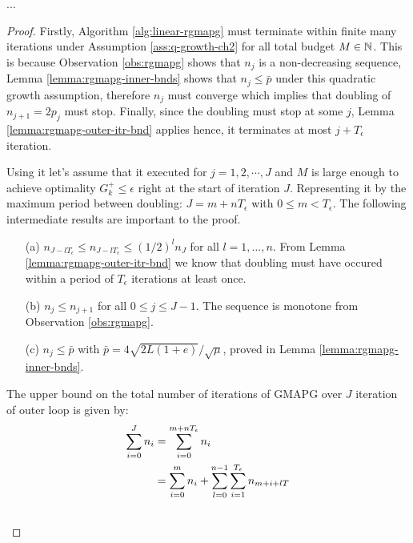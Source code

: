 \documentclass[12pt]{report}
\begin{document}
        \begin{theorem}
            ...
        \end{theorem}
        \begin{proof}
            Firstly, Algorithm \ref{alg:linear-rgmapg} must terminate within finite many iterations under Assumption \ref{ass:q-growth-ch2} for all total budget $M \in \mathbb N$. 
            This is because Observation \ref{obs:rgmapg} shows that $n_j$ is a non-decreasing sequence, Lemma \ref{lemma:rgmapg-inner-bnds} shows that $n_j \le \bar p$ under this quadratic growth assumption, therefore $n_j$ must converge which implies that doubling of $n_{j + 1} = 2p_{j}$ must stop. 
            Finally, since the doubling must stop at some $j$, Lemma \ref{lemma:rgmapg-outer-itr-bnd} applies hence, it terminates at most $j + T_\epsilon$ iteration. 
            \par
            Using it let's assume that it executed for $j = 1, 2, \cdots, J$ and $M$ is large enough to achieve optimality $G^+_k \le \epsilon$ right at the start of iteration $J$.
            Representing it by the maximum period between doubling: $J = m + nT_\epsilon$ with $0 \le m < T_\epsilon$. 
            The following intermediate results are important to the proof. 
            \begin{enumerate}
                \item [(a)] $n_{J - lT_\epsilon} \le n_{J - lT_\epsilon}\le (1/2)^ln_J$ for all $l = 1, \ldots, n$. From Lemma \ref{lemma:rgmapg-outer-itr-bnd} we know that doubling must have occured within a period of $T_\epsilon$ iterations at least once.
                \item [(b)] $n_{j} \le n_{j + 1}$ for all $0 \le j \le J - 1$. The sequence is monotone from Observation \ref{obs:rgmapg}. 
                \item [(c)] $n_j \le \bar p$ with $\bar p = 4\sqrt{2L(1 + e)}/\sqrt{\mu}$, proved in Lemma \ref{lemma:rgmapg-inner-bnds}. 
            \end{enumerate}
            The upper bound on the total number of iterations of GMAPG over $J$ iteration of outer loop is given by: 
            \begin{align*}
                \sum_{i = 0}^{J} n_i &= \sum_{i = 0}^{m + nT_\epsilon} n_i
                \\
                &= \sum_{i = 0}^{m}n_i + \sum_{l = 0}^{n - 1}\sum_{i = 1}^{T_\epsilon} n_{m + i + lT}
                \\
                &\hspace{-0.5em}

\end{align*}
\end{proof}
\end{document}
